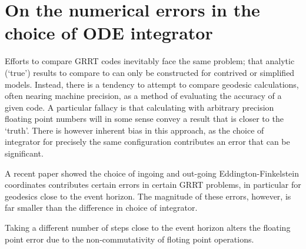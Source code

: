 \section{On the numerical errors in the choice of ODE integrator}
\label{appendix:solvers}

Efforts to compare GRRT codes inevitably face the same problem; that analytic (`true') results to compare to can only be constructed for contrived or simplified models. Instead, there is a tendency to attempt to compare geodesic calculations, often nearing machine precision, as a method of evaluating the accuracy of a given code. A particular fallacy is that calculating with arbitrary precision floating point numbers will in some sense convey a result that is closer to the `truth'. There is however inherent bias in this approach, as the choice of integrator for precisely the same configuration contributes an error that can be significant.

A recent paper showed the choice of ingoing and out-going Eddington-Finkelstein coordinates contributes certain errors in certain GRRT problems, in particular for geodesics close to the event horizon. The magnitude of these errors, however, is far smaller than the difference in choice of integrator.

Taking a different number of steps close to the event horizon alters the floating point error due to the non-commutativity of floting point operations.



